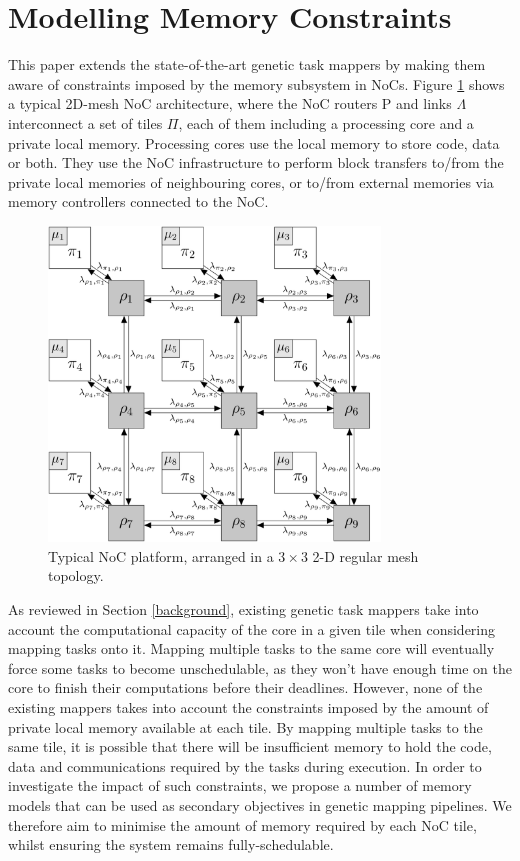 \documentclass[conference]{IEEEtran}
\begin{document}
\section{Modelling Memory Constraints}\label{modelling_memory_constraints}

This paper extends the state-of-the-art genetic task mappers by making them aware of constraints imposed by the memory subsystem in NoCs. Figure \ref{fig:noc} shows a typical 2D-mesh NoC architecture, where the NoC routers $\mathrm{P}$ and links $\Lambda$ interconnect a set of tiles $\Pi$, each of them including a processing core and a private local memory. Processing cores use the local memory to store code, data or both. They use the NoC infrastructure to perform block transfers to/from the private local memories of neighbouring cores, or to/from external memories via memory controllers connected to the NoC. 

\begin{figure}[!h]
	\centering
	\includegraphics*[width=8.8cm,keepaspectratio]{img/noc}
  	\caption{Typical NoC platform, arranged in a $3\times3$ 2-D regular mesh topology.}
	\label{fig:noc}
\end{figure}

As reviewed in Section \ref{background}, existing genetic task mappers take into account the computational capacity of the core in a given tile when considering mapping tasks onto it. Mapping multiple tasks to the same core will eventually force some tasks to become unschedulable, as they won't have enough time on the core to finish their computations before their deadlines. However, none of the existing mappers takes into account the constraints imposed by the amount of private local memory available at each tile. By mapping multiple tasks to the same tile, it is possible that there will be insufficient memory to hold the code, data and communications required by the tasks during execution. In order to investigate the impact of such constraints, we propose a number of memory models that can be used as secondary objectives in genetic mapping pipelines. We therefore aim to minimise the amount of memory required by each NoC tile, whilst ensuring the system remains fully-schedulable.
\end{document}
